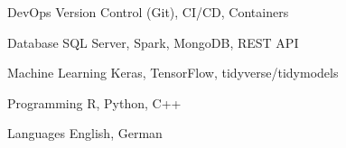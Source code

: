 

\begin{cvskills}

  \cvskill
    {DevOps} %
    {Version Control (Git), CI/CD, Containers} %

  \cvskill
    {Database} %
    {SQL Server, Spark, MongoDB, REST API} %
    
  \cvskill
    {Machine Learning} %
    {Keras, TensorFlow, tidyverse/tidymodels} %

  \cvskill
    {Programming} %
    {R, Python, C++} %

  \cvskill
    {Languages} %
    {English, German} %

\end{cvskills}
